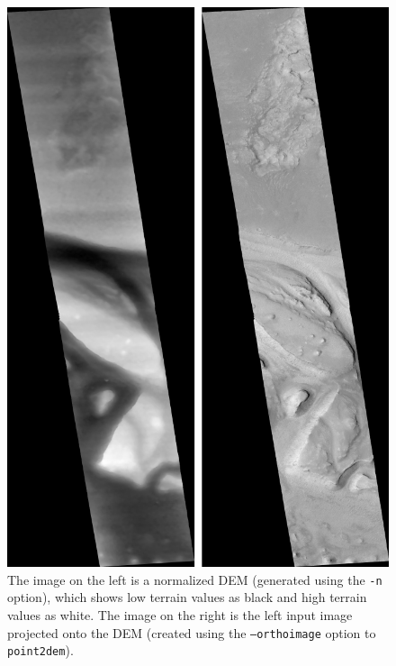 \begin{figure}
\begin{minipage}{5in}
\includegraphics[width=5in]{images/p19-norm_ortho.png}
\end{minipage}
\hfill
\begin{minipage}{1.5in}
\caption[P19 Normalized DEM and Orthophoto]{
    \label{p19-norm_ortho}
	The image on the left is a normalized DEM (generated using the
        \texttt{-n} option), which shows low terrain values as black
        and high terrain values as white.  The image on the right is
        the left input image projected onto the DEM (created using the
        \texttt{--orthoimage} option to \texttt{point2dem}).  }
\end{minipage} \end{figure}

